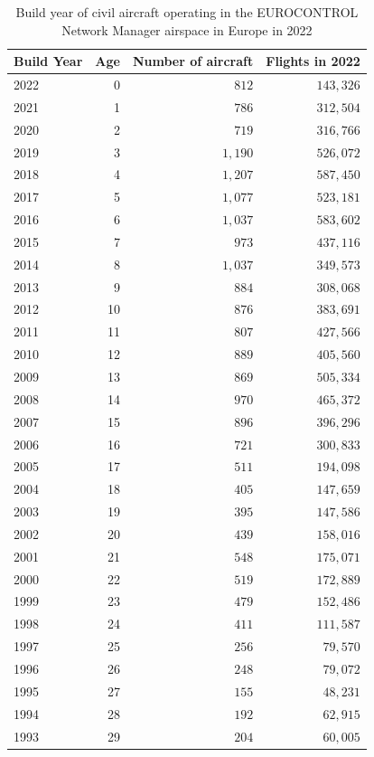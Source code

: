 \documentclass[
  11pt,
  a4paper,
]{book}
\begin{document}
\hypertarget{tbl-fleet-age}{}
\setlength{\LTpost}{0mm}
\begin{longtable}{lrrr}
\caption{\label{tbl-fleet-age}Build year of civil aircraft operating in the EUROCONTROL Network
Manager airspace in Europe in 2022 }\tabularnewline

\toprule
Build Year & Age & Number of aircraft & Flights in 2022 \\ 
\midrule
2022 & 0 & $812$ & $143,326$ \\ 
2021 & 1 & $786$ & $312,504$ \\ 
2020 & 2 & $719$ & $316,766$ \\ 
2019 & 3 & $1,190$ & $526,072$ \\ 
2018 & 4 & $1,207$ & $587,450$ \\ 
2017 & 5 & $1,077$ & $523,181$ \\ 
2016 & 6 & $1,037$ & $583,602$ \\ 
2015 & 7 & $973$ & $437,116$ \\ 
2014 & 8 & $1,037$ & $349,573$ \\ 
2013 & 9 & $884$ & $308,068$ \\ 
2012 & 10 & $876$ & $383,691$ \\ 
2011 & 11 & $807$ & $427,566$ \\ 
2010 & 12 & $889$ & $405,560$ \\ 
2009 & 13 & $869$ & $505,334$ \\ 
2008 & 14 & $970$ & $465,372$ \\ 
2007 & 15 & $896$ & $396,296$ \\ 
2006 & 16 & $721$ & $300,833$ \\ 
2005 & 17 & $511$ & $194,098$ \\ 
2004 & 18 & $405$ & $147,659$ \\ 
2003 & 19 & $395$ & $147,586$ \\ 
2002 & 20 & $439$ & $158,016$ \\ 
2001 & 21 & $548$ & $175,071$ \\ 
2000 & 22 & $519$ & $172,889$ \\ 
1999 & 23 & $479$ & $152,486$ \\ 
1998 & 24 & $411$ & $111,587$ \\ 
1997 & 25 & $256$ & $79,570$ \\ 
1996 & 26 & $248$ & $79,072$ \\ 
1995 & 27 & $155$ & $48,231$ \\ 
1994 & 28 & $192$ & $62,915$ \\ 
1993 & 29 & $204$ & $60,005$ \\ 

\end{longtable}
\end{document}
